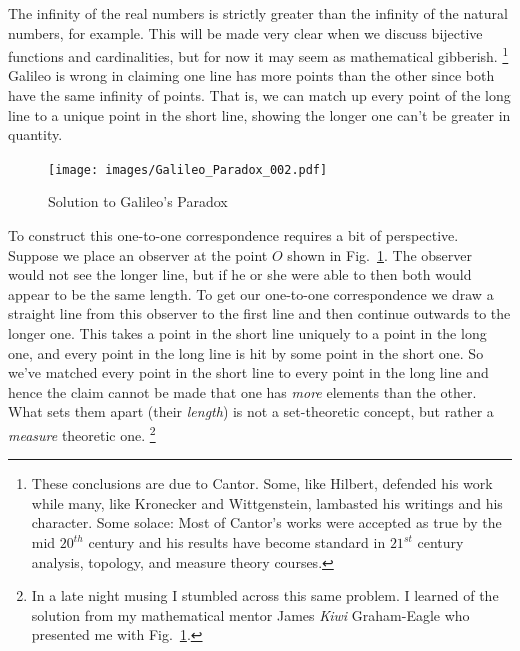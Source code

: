             The infinity of the real numbers is strictly greater than the
            infinity of the natural numbers, for example. This will be made very
            clear when we discuss bijective functions and cardinalities, but for
            now it may seem as mathematical gibberish.%
            \footnote{%
                These conclusions are due to Cantor. Some, like Hilbert,
                defended his work while many, like Kronecker and Wittgenstein,
                lambasted his writings and his character. Some solace: Most of
                Cantor's works were accepted as true by the mid $20^{th}$
                century and his results have become standard in $21^{st}$
                century analysis, topology, and measure theory courses.
            }
            Galileo is wrong in claiming one line has more points than the other
            since both have the same infinity of points. That is, we can match
            up every point of the long line to a unique point in the short line,
            showing the longer one can't be greater in quantity.
            \begin{figure}
                \centering
                \captionsetup{type=figure}
                \texttt{[image: images/Galileo\_Paradox\_002.pdf]}
                \caption{Solution to Galileo's Paradox}
                \label{fig:Galileo_Paradox_002}
            \end{figure}
            To construct this one-to-one correspondence requires a bit of
            perspective. Suppose we place an observer at the point $O$ shown in
            Fig.~\ref{fig:Galileo_Paradox_002}. The observer would not see the
            longer line, but if he or she were able to then both would appear to
            be the same length. To get our one-to-one correspondence we draw a
            straight line from this observer to the first line and then continue
            outwards to the longer one. This takes a point in the short line
            uniquely to a point in the long one, and every point in the long
            line is hit by some point in the short one. So we've matched every
            point in the short line to every point in the long line and hence
            the claim cannot be made that one has \textit{more} elements than
            the other. What sets them apart (their \textit{length}) is not a
            set-theoretic concept, but rather a \textit{measure} theoretic one.%
            \footnote{%
                In a late night musing I stumbled across this same problem. I
                learned of the solution from my mathematical mentor James
                \textit{Kiwi} Graham-Eagle who presented me with
                Fig.~\ref{fig:Galileo_Paradox_002}.
            }
